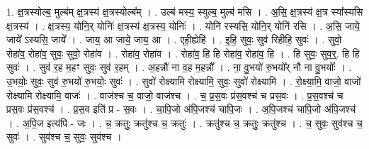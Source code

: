 \documentclass[17pt]{extarticle}
\begin{document}
1. क्ष॒त्रस्योल्ब॒ मुल्ब॑म् क्ष॒त्रस्य॑ क्ष॒त्रस्योल्ब᳚म् । . उल्ब॑ मस्य॒ स्युल्ब॒ मुल्ब॑ मसि । . अ॒सि॒ क्ष॒त्रस्य॑ क्ष॒त्र स्या᳚स्यसि क्ष॒त्रस्य॑ । . क्ष॒त्रस्य॒ योनि॒र् योनिः॑ क्ष॒त्रस्य॑ क्ष॒त्रस्य॒ योनिः॑ । . योनि॑ रस्यसि॒ योनि॒र् योनि॑ रसि । . अ॒सि॒ जाये॒ जाये᳚ ऽस्यसि॒ जाये᳚ । . जाय॒ आ जाये॒ जाय॒ आ । . एही॒ह्येहि॑ । . इ॒हि॒ सुवः॒ सुव॑ रिहीहि॒ सुवः॑ । . सुवो॒ रोहा॑व॒ रोहा॑व॒ सुवः॒ सुवो॒ रोहा॑व । . रोहा॑व॒ रोहा॑व । . रोहा॑व॒ हि हि रोहा॑व॒ रोहा॑व॒ हि । . हि सुवः॒ सुव॒र्॒. हि हि सुवः॑ । . सुव॑ र॒ह म॒हꣳ सुवः॒ सुव॑ र॒हम् । . अ॒हन्नौ॑ ना व॒ह म॒हन्नौ᳚ । . ना॒ वु॒भयो॑ रु॒भयो᳚र् नौ ना वु॒भयोः᳚ । . उ॒भयोः॒ सुवः॒ सुव॑ रु॒भयो॑ रु॒भयोः॒ सुवः॑ । . सुवो॑ रोक्ष्यामि रोक्ष्यामि॒ सुवः॒ सुवो॑ रोक्ष्यामि । . रो॒क्ष्या॒मि॒ वाजो॒ वाजो॑ रोक्ष्यामि रोक्ष्यामि॒ वाजः॑ । . वाज॑श्च च॒ वाजो॒ वाज॑श्च । . च॒ प्र॒स॒वः प्र॑स॒वश्च॑ च प्रस॒वः । . प्र॒स॒वश्च॑ च प्रस॒वः प्र॑स॒वश्च॑ । . प्र॒स॒व इति॑ प्र - स॒वः । . चा॒पि॒जो अ॑पि॒जश्च॑ चापि॒जः । . अ॒पि॒जश्च॑ चापि॒जो अ॑पि॒जश्च॑ । . अ॒पि॒ज इत्य॑पि - जः । . च॒ क्रतुः॒ क्रतु॑श्च च॒ क्रतुः॑ । . क्रतु॑श्च च॒ क्रतुः॒ क्रतु॑श्च । . च॒ सुवः॒ सुव॑श्च च॒ सुवः॑ । . सुव॑श्च च॒ सुवः॒ सुव॑श्च । \newline
\end{document}
